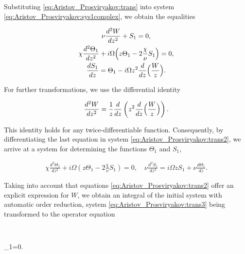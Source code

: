 Substituting \eqref{eq:Aristov_Prosviryakov:trans} into system \eqref{eq:Aristov_Prosviryakov:sys1complex}, we obtain the equalities

 \begin{gather}

\nu\frac{d^2 W}{dz^2}+S_1=0,

\\

       \label{eq:Aristov_Prosviryakov:trans2}

\chi\frac{d^2 \Theta_1}{d z^2}+i\Omega \Bigl(z \Theta_1- 2\frac{\chi}{\nu}S_1\Bigr)=0,       

\\

\frac{d S_1}{dz}=\Theta_1-i\Omega z^2 \frac{d}{dz}\Bigl(\frac{W}{z}\Bigr). 

 \end{gather}

 

For further transformations, we use the differential identity

$$

\frac{d^2 W}{dz^2}=\frac{1}{z}\frac{d}{dz}\left(z^2\frac{d}{dz}\Bigl(\frac{W}{z}\Bigr)\right).

$$

This identity holds for any twice-differentiable function. Consequently, by differentiating the last equation in system \eqref{eq:Aristov_Prosviryakov:trans2}, we arrive at a system for determining the functions  $\Theta_1$  and  $S_1,$

 \begin{gather}

       \label{eq:Aristov_Prosviryakov:trans3}

\chi\frac{d^2 \Theta_1}{d z^2}+i\Omega \left(z \Theta_1- 2\frac{\chi}{\nu}S_1\right)=0,

\quad 

\nu\frac{d^2 S_1}{dz^2}=i\Omega z S_1 +\nu \frac{d \Theta_1}{dz}.          

 \end{gather}

 

Taking into account that equations \eqref{eq:Aristov_Prosviryakov:trans2} offer an explicit expression for  $W$, we obtain an integral of the initial system with automatic order reduction, system \eqref{eq:Aristov_Prosviryakov:trans3} being transformed to the operator equation

$$

\Theta_1=0.

